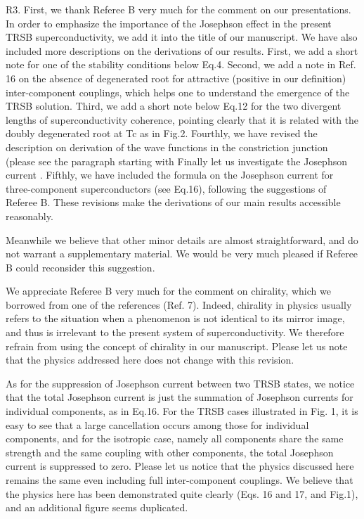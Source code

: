 \documentclass[11pt]{article}
\begin{document}
R3. First, we thank Referee B very much for the comment on our
presentations. In order to emphasize the importance of the Josephson
effect in the present TRSB superconductivity, we add it into the title
of our manuscript. We have also included more descriptions on the
derivations of our results. First, we add a short note for one of the
stability conditions below Eq.4. Second, we add a note in Ref. 16 on the
absence of degenerated root for attractive (positive in our definition)
inter-component couplings, which helps one to understand the emergence
of the TRSB solution. Third, we add a short note below Eq.12 for the two
divergent lengths of superconductivity coherence, pointing clearly that
it is related with the doubly degenerated root at Tc as in Fig.2.
Fourthly, we have revised the description on derivation of the wave
functions in the constriction junction (please see the paragraph
starting with Finally let us investigate the Josephson current .
Fifthly, we have included the formula on the Josephson current for
three-component superconductors (see Eq.16), following the suggestions
of Referee B. These revisions make the derivations of our main results
accessible reasonably.

Meanwhile we believe that other minor details are almost
straightforward, and do not warrant a supplementary material. We would
be very much pleased if Referee B could reconsider this suggestion.

We appreciate Referee B very much for the comment on chirality, which we
borrowed from one of the references (Ref. 7). Indeed, chirality in
physics usually refers to the situation when a phenomenon is not
identical to its mirror image, and thus is irrelevant to the present
system of superconductivity. We therefore refrain from using the concept
of chirality in our manuscript. Please let us note that the physics
addressed here does not change with this revision.

As for the suppression of Josephson current between two TRSB states, we
notice that the total Josephson current is just the summation of
Josephson currents for individual components, as in Eq.16. For the TRSB
cases illustrated in Fig. 1, it is easy to see that a large cancellation
occurs among those for individual components, and for the isotropic
case, namely all components share the same strength and the same
coupling with other components, the total Josephson current is
suppressed to zero. Please let us notice that the physics discussed here
remains the same even including full inter-component couplings. We
believe that the physics here has been demonstrated quite clearly (Eqs.
16 and 17, and Fig.1), and an additional figure seems duplicated.
\end{document}
